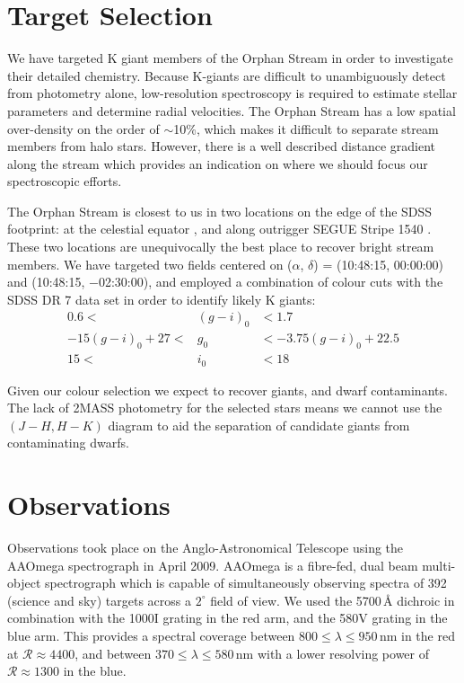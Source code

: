 \documentclass{emulateapj}
\begin{document}
\section{Target Selection}
\label{sec:target-selection}

We have targeted K giant members of the Orphan Stream in order to investigate their detailed chemistry. Because K-giants are difficult to unambiguously detect from photometry alone, low-resolution spectroscopy is required to estimate stellar parameters and determine radial velocities. The Orphan Stream has a low spatial over-density on the order of $\sim$10\%, which makes it difficult to separate stream members from halo stars. However, there is a well described distance gradient along the stream \citep{Belokurov;et-al_2007, Newberg;et-al_2010} which provides an indication on where we should focus our spectroscopic efforts.

The Orphan Stream is closest to us in two locations on the edge of the SDSS footprint: at the celestial equator \citep{Belokurov;et-al_2007}, and along outrigger SEGUE Stripe 1540 \citep{Newberg;et-al_2010}. These two locations are unequivocally the best place to recover bright stream members. We have targeted two fields centered on ($\alpha$, $\delta$) = (10:48:15, 00:00:00) and (10:48:15, $-$02:30:00), and employed a combination of colour cuts with the SDSS DR 7 \citep{Abazajian;et-al_2009} data set in order to identify likely K giants:
\begin{eqnarray}
0.6 <& (g-i)_0 &< 1.7 \\
-15(g-i)_0 + 27 <& g_0 &< -3.75(g-i)_0 + 22.5 \\
15  <& i_0  &< 18 
\end{eqnarray}

Given our colour selection we expect to recover giants, and dwarf contaminants. The lack of 2MASS photometry for the selected stars means we cannot use the $(J-H, H-K)$ diagram to aid the separation of candidate giants from contaminating dwarfs.

\section{Observations}
\label{sec:observations}

Observations took place on the Anglo-Astronomical Telescope using the AAOmega spectrograph in April 2009. AAOmega is a fibre-fed, dual beam multi-object spectrograph which is capable of simultaneously observing spectra of 392 (science and sky) targets across a $2^\circ$ field of view. We used the 5700\,{\AA} dichroic in combination with the 1000I grating in the red arm, and the 580V grating in the blue arm. This provides a spectral coverage between $800 \leq \lambda \leq 950$\,nm in the red at $\mathcal{R} \approx 4400$, and between $370 \leq \lambda \leq 580$\,nm with a lower resolving power of $\mathcal{R} \approx 1300$ in the blue.
\end{document}
